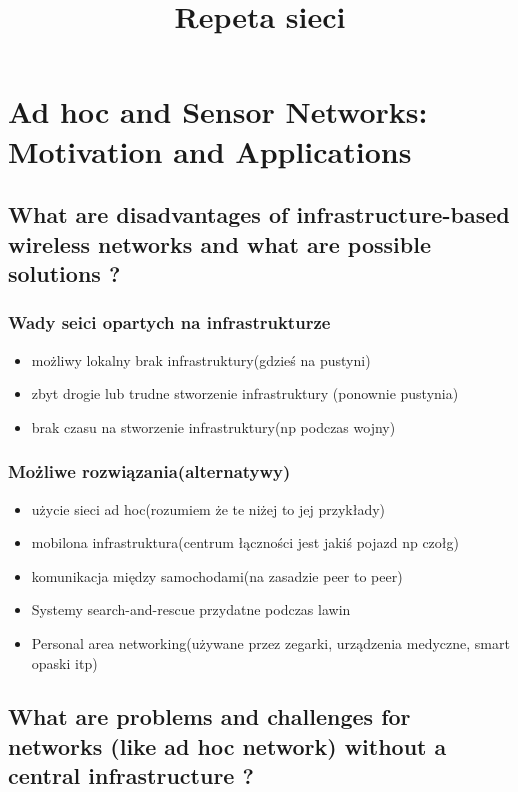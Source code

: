 

\title{Repeta sieci}


\maketitle
\section{Ad hoc and Sensor Networks: Motivation and Applications}

\subsection{What are disadvantages of infrastructure-based wireless networks and what are possible solutions ?}

\subsubsection{Wady seici opartych na infrastrukturze}
\begin{itemize}
\item możliwy lokalny brak infrastruktury(gdzieś na pustyni)
\item zbyt drogie lub trudne stworzenie infrastruktury (ponownie pustynia)
\item brak czasu na stworzenie infrastruktury(np podczas wojny)
\end{itemize}
\subsubsection{Możliwe rozwiązania(alternatywy)}
\begin{itemize}
\item użycie sieci ad hoc(rozumiem że te niżej to jej przykłady)

\item mobilona infrastruktura(centrum łączności jest jakiś pojazd np czołg)
\item komunikacja między samochodami(na zasadzie peer to peer)
\item Systemy search-and-rescue przydatne podczas lawin
\item Personal area networking(używane przez zegarki, urządzenia medyczne, smart opaski itp)

\end{itemize}

\subsection{What are problems and challenges for networks (like ad hoc network) without a central infrastructure ?}


